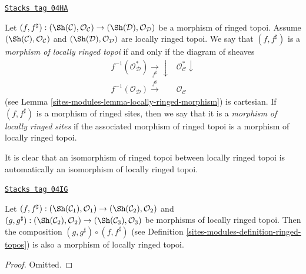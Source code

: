 \begin{definition}
\label{sites-modules-definition-morphism-locally-ringed-topoi}
\href{https://stacks.math.columbia.edu/tag/04HA}{\texttt{Stacks tag 04HA}}

Let $(f, f^\sharp) : (\Sh(\mathcal{C}), \mathcal{O}_\mathcal{C})
\to (\Sh(\mathcal{D}), \mathcal{O}_\mathcal{D})$
be a morphism of ringed topoi. Assume
$(\Sh(\mathcal{C}), \mathcal{O}_\mathcal{C})$
and
$(\Sh(\mathcal{D}), \mathcal{O}_\mathcal{D})$
are locally ringed topoi. We say that $(f, f^\sharp)$ is a
{\it morphism of locally ringed topoi} if and only if the
diagram of sheaves
$$
\begin{array}{cc}f^{-1}(\mathcal{O}^*_\mathcal{D}) \underset{f^\sharp}{\longrightarrow}\downarrow & \mathcal{O}^*_\mathcal{C} \downarrow \\ f^{-1}(\mathcal{O}_\mathcal{D}) \overset{f^\sharp}{\longrightarrow} & \mathcal{O}_\mathcal{C}\end{array}
$$
(see
Lemma \ref{sites-modules-lemma-locally-ringed-morphism})
is cartesian. If $(f, f^\sharp)$ is a morphism of ringed sites, then
we say that it is a {\it morphism of locally ringed sites} if
the associated morphism of ringed topoi is a morphism of locally ringed
topoi.
\end{definition}

It is clear that an isomorphism of ringed topoi between locally ringed
topoi is automatically an isomorphism of locally ringed topoi.

\begin{lemma}
\label{sites-modules-lemma-composition-morphisms-locally-ringed-topoi}
\href{https://stacks.math.columbia.edu/tag/04IG}{\texttt{Stacks tag 04IG}}

Let
$(f, f^\sharp) :
(\Sh(\mathcal{C}_1), \mathcal{O}_1)
\to (\Sh(\mathcal{C}_2), \mathcal{O}_2)$ and
$(g, g^\sharp) :
(\Sh(\mathcal{C}_2), \mathcal{O}_2) \to
(\Sh(\mathcal{C}_3), \mathcal{O}_3)$
be morphisms of locally ringed topoi. Then the composition
$(g, g^\sharp) \circ (f, f^\sharp)$ (see
Definition \ref{sites-modules-definition-ringed-topos})
is also a morphism of locally ringed topoi.
\end{lemma}

\begin{proof}
Omitted.
\end{proof}

